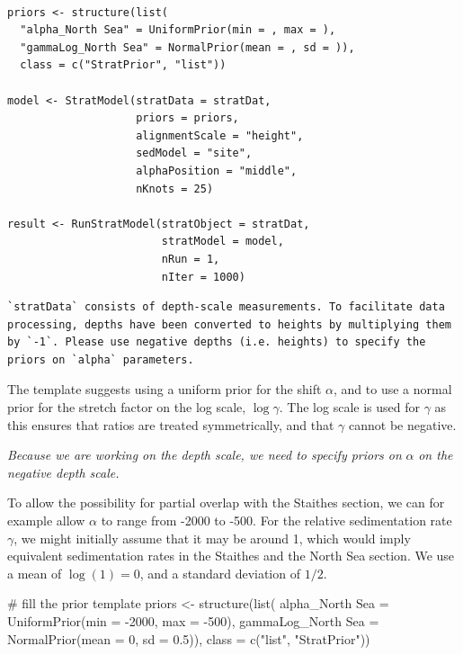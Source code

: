 \documentclass[
  letterpaper,
  DIV=11,
  numbers=noendperiod]{scrartcl}
\newenvironment{Shaded}{\begin{snugshade}}{\end{snugshade}}
\newcommand{\AttributeTok}[1]{\textcolor[rgb]{0.40,0.45,0.13}{#1}}
\newcommand{\CommentTok}[1]{\textcolor[rgb]{0.37,0.37,0.37}{#1}}
\newcommand{\DecValTok}[1]{\textcolor[rgb]{0.68,0.00,0.00}{#1}}
\newcommand{\FloatTok}[1]{\textcolor[rgb]{0.68,0.00,0.00}{#1}}
\newcommand{\FunctionTok}[1]{\textcolor[rgb]{0.28,0.35,0.67}{#1}}
\newcommand{\NormalTok}[1]{\textcolor[rgb]{0.00,0.23,0.31}{#1}}
\newcommand{\OtherTok}[1]{\textcolor[rgb]{0.00,0.23,0.31}{#1}}
\newcommand{\SpecialCharTok}[1]{\textcolor[rgb]{0.37,0.37,0.37}{#1}}
\newcommand{\StringTok}[1]{\textcolor[rgb]{0.13,0.47,0.30}{#1}}
\begin{document}
\begin{verbatim}

priors <- structure(list(
  "alpha_North Sea" = UniformPrior(min = , max = ),
  "gammaLog_North Sea" = NormalPrior(mean = , sd = )),
  class = c("StratPrior", "list"))

model <- StratModel(stratData = stratDat,
                    priors = priors,
                    alignmentScale = "height",
                    sedModel = "site",
                    alphaPosition = "middle",
                    nKnots = 25)

result <- RunStratModel(stratObject = stratDat,
                        stratModel = model,
                        nRun = 1,
                        nIter = 1000)
\end{verbatim}

\begin{verbatim}
`stratData` consists of depth-scale measurements. To facilitate data processing, depths have been converted to heights by multiplying them by `-1`. Please use negative depths (i.e. heights) to specify the priors on `alpha` parameters.
\end{verbatim}

The template suggests using a uniform prior for the shift \(\alpha\),
and to use a normal prior for the stretch factor on the log scale,
\(\log \gamma\). The log scale is used for \(\gamma\) as this ensures
that ratios are treated symmetrically, and that \(\gamma\) cannot be
negative.

\emph{Because we are working on the depth scale, we need to specify
priors on} \(\alpha\) \emph{on the negative depth scale.}

To allow the possibility for partial overlap with the Staithes section,
we can for example allow \(\alpha\) to range from -2000 to -500. For the
relative sedimentation rate \(\gamma\), we might initially assume that
it may be around 1, which would imply equivalent sedimentation rates in
the Staithes and the North Sea section. We use a mean of
\(\log(1) = 0\), and a standard deviation of \(1/2\).

\begin{Shaded}
\begin{Highlighting}[]
\CommentTok{\# fill the prior template}
\NormalTok{priors }\OtherTok{\textless{}{-}} \FunctionTok{structure}\NormalTok{(}\FunctionTok{list}\NormalTok{(}
  \StringTok{\textasciigrave{}}\AttributeTok{alpha\_North Sea}\StringTok{\textasciigrave{}} \OtherTok{=} \FunctionTok{UniformPrior}\NormalTok{(}\AttributeTok{min =} \SpecialCharTok{{-}}\DecValTok{2000}\NormalTok{, }\AttributeTok{max =} \SpecialCharTok{{-}}\DecValTok{500}\NormalTok{),}
  \StringTok{\textasciigrave{}}\AttributeTok{gammaLog\_North Sea}\StringTok{\textasciigrave{}} \OtherTok{=} \FunctionTok{NormalPrior}\NormalTok{(}\AttributeTok{mean =} \DecValTok{0}\NormalTok{, }\AttributeTok{sd =} \FloatTok{0.5}\NormalTok{)),}
\AttributeTok{class =} \FunctionTok{c}\NormalTok{(}\StringTok{"list"}\NormalTok{, }\StringTok{"StratPrior"}\NormalTok{))}
\end{Highlighting}
\end{Shaded}
\end{document}
